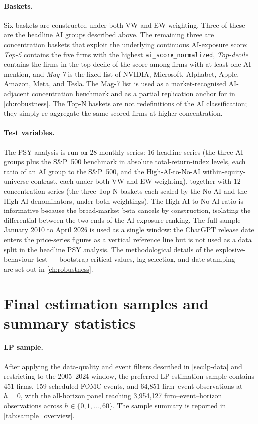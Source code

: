 \paragraph{Baskets.} Six baskets are constructed under both VW and EW weighting. Three of these are the headline AI groups described above. The remaining three are concentration baskets that exploit the underlying continuous AI-exposure score: \emph{Top-5} contains the five firms with the highest \texttt{ai\_score\_normalized}, \emph{Top-decile} contains the firms in the top decile of the score among firms with at least one AI mention, and \emph{Mag-7} is the fixed list of NVIDIA, Microsoft, Alphabet, Apple, Amazon, Meta, and Tesla. The Mag-7 list is used as a market-recognised AI-adjacent concentration benchmark and as a partial replication anchor for \citet{baselePhillipsShi2025} in \cref{ch:robustness}. The Top-N baskets are not redefinitions of the AI classification; they simply re-aggregate the same scored firms at higher concentration.

\paragraph{Test variables.} The PSY analysis is run on $28$ monthly series: $16$ headline series (the three AI groups plus the S\&P~500 benchmark in absolute total-return-index levels, each ratio of an AI group to the S\&P~500, and the High-AI-to-No-AI within-equity-universe contrast, each under both VW and EW weighting), together with $12$ concentration series (the three Top-N baskets each scaled by the No-AI and the High-AI denominators, under both weightings). The High-AI-to-No-AI ratio is informative because the broad-market beta cancels by construction, isolating the differential between the two ends of the AI-exposure ranking. The full sample January 2010 to April 2026 is used as a single window: the ChatGPT release date enters the price-series figures as a vertical reference line but is not used as a data split in the headline PSY analysis. The methodological details of the explosive-behaviour test --- bootstrap critical values, lag selection, and date-stamping --- are set out in \cref{ch:robustness}.

\section{Final estimation samples and summary statistics}
\label{sec:final-sample}

\paragraph{LP sample.} After applying the data-quality and event filters described in \cref{sec:lp-data} and restricting to the 2005--2024 window, the preferred LP estimation sample contains 451 firms, 159 scheduled FOMC events, and 64{,}851 firm--event observations at $h=0$, with the all-horizon panel reaching 3{,}954{,}127 firm--event--horizon observations across $h \in \{0,1,\dots,60\}$. The sample summary is reported in \cref{tab:sample_overview}.

